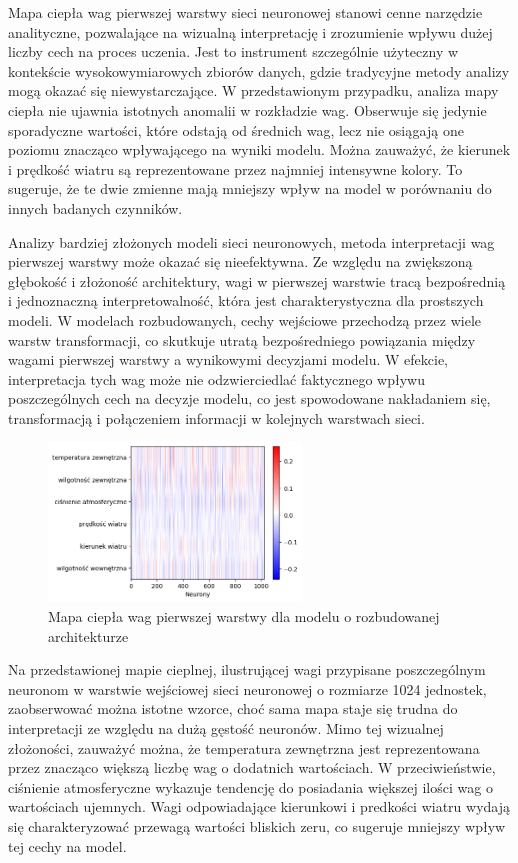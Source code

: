 \documentclass[a4paper,twoside,12pt]{book}
\begin{document}
Mapa ciepła wag pierwszej warstwy sieci neuronowej stanowi cenne narzędzie analityczne, pozwalające na wizualną interpretację i zrozumienie wpływu dużej liczby cech na proces uczenia. Jest to instrument szczególnie użyteczny w kontekście wysokowymiarowych zbiorów danych, gdzie tradycyjne metody analizy mogą okazać się niewystarczające. W przedstawionym przypadku, analiza mapy ciepła nie ujawnia istotnych anomalii w rozkładzie wag. Obserwuje się jedynie sporadyczne wartości, które odstają od średnich wag, lecz nie osiągają one poziomu znacząco wpływającego na wyniki modelu. Można zauważyć, że kierunek i prędkość wiatru są reprezentowane przez najmniej intensywne kolory. To sugeruje, że te dwie zmienne mają mniejszy wpływ na model w porównaniu do innych badanych czynników.


Analizy bardziej złożonych modeli sieci neuronowych, metoda interpretacji wag pierwszej warstwy może okazać się nieefektywna. Ze względu na zwiększoną głębokość i złożoność architektury, wagi w pierwszej warstwie tracą bezpośrednią i jednoznaczną interpretowalność, która jest charakterystyczna dla prostszych modeli. W modelach rozbudowanych, cechy wejściowe przechodzą przez wiele warstw transformacji, co skutkuje utratą bezpośredniego powiązania między wagami pierwszej warstwy a wynikowymi decyzjami modelu. W efekcie, interpretacja tych wag może nie odzwierciedlać faktycznego wpływu poszczególnych cech na decyzje modelu, co jest spowodowane nakładaniem się, transformacją i połączeniem informacji w kolejnych warstwach sieci.

\begin{figure}[!h]
  \centering
  \includegraphics[width=0.6\textwidth]{img/heatmap2.png}
  \caption{Mapa ciepła wag pierwszej warstwy dla modelu o rozbudowanej architekturze}
  \label{fig:etykieta-rysunku}
\end{figure}


Na przedstawionej mapie cieplnej, ilustrującej wagi przypisane poszczególnym neuronom w warstwie wejściowej sieci neuronowej o rozmiarze 1024 jednostek, zaobserwować można istotne wzorce, choć sama mapa staje się trudna do interpretacji ze względu na dużą gęstość neuronów. Mimo tej wizualnej złożoności, zauważyć można, że temperatura zewnętrzna jest reprezentowana przez znacząco większą liczbę wag o dodatnich wartościach. W przeciwieństwie, ciśnienie atmosferyczne wykazuje tendencję do posiadania większej ilości wag o wartościach ujemnych. Wagi odpowiadające kierunkowi i predkości wiatru wydają się charakteryzować przewagą wartości bliskich zeru, co sugeruje mniejszy wpływ tej cechy na model.
\end{document}
